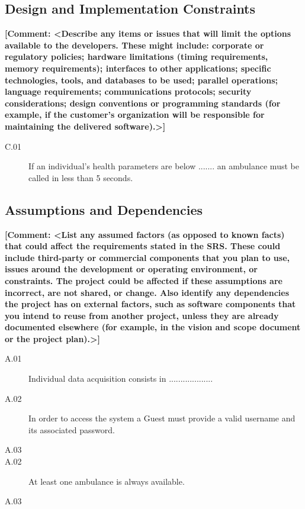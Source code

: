 \documentclass[a4paper]{article}
\newcommand{\comment}[1]{\textbf{[Comment: #1]}}
\begin{document}
    \subsection{Design and Implementation Constraints}
    \comment{<Describe any items or issues that will limit the options available to the developers. These might include: corporate or regulatory policies; hardware limitations (timing requirements, memory requirements); interfaces to other applications; specific technologies, tools, and databases to be used; parallel operations; language requirements; communications protocols; security considerations; design conventions or programming standards (for example, if the customer’s organization will be responsible for maintaining the delivered software).>}
    
    \begin{description}
        \item[C.01] If an individual's health parameters are below ....... an ambulance must be called in less than 5 seconds.
    \end{description}
    
    \subsection{Assumptions and Dependencies}
    \comment{<List any assumed factors (as opposed to known facts) that could affect the requirements stated in the SRS. These could include third-party or commercial components that you plan to use, issues around the development or operating environment, or constraints. The project could be affected if these assumptions are incorrect, are not shared, or change. Also identify any dependencies the project has on external factors, such as software components that you intend to reuse from another project, unless they are already documented elsewhere (for example, in the vision and scope document or the project plan).>}

        \begin{description}
        \item[A.01] Individual data acquisition consists in ...................
        \item[A.02] In order to access the system a Guest must provide a valid username and its associated password.
        \item[A.03]
        \item[A.02] At least one ambulance is always available.
        \item[A.03]
    \end{description}
    
\end{document}
